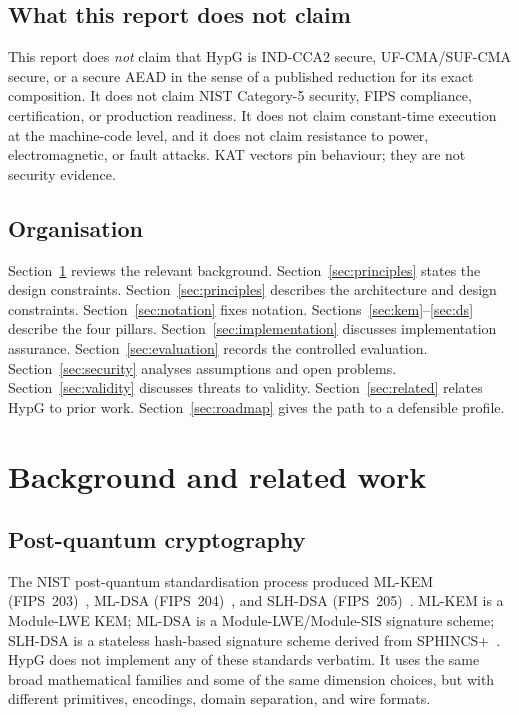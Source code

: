 \documentclass[runningheads]{llncs}
\begin{document}
\subsection{What this report does not claim}

This report does \emph{not} claim that HypG is IND-CCA2 secure,
UF-CMA/SUF-CMA secure, or a secure AEAD in the sense of a published
reduction for its exact composition.  It does not claim NIST Category-5
security, FIPS compliance, certification, or production readiness.  It
does not claim constant-time execution at the machine-code level, and it
does not claim resistance to power, electromagnetic, or fault attacks.
KAT vectors pin behaviour; they are not security evidence.

\subsection{Organisation}

Section~\ref{sec:background} reviews the relevant background.
Section~\ref{sec:principles} states the design constraints.
Section~\ref{sec:principles} describes the architecture and design constraints.
Section~\ref{sec:notation} fixes notation.
Sections~\ref{sec:kem}--\ref{sec:ds} describe the four pillars.
Section~\ref{sec:implementation} discusses implementation assurance.
Section~\ref{sec:evaluation} records the controlled evaluation.
Section~\ref{sec:security} analyses assumptions and open problems.
Section~\ref{sec:validity} discusses threats to validity.
Section~\ref{sec:related} relates HypG to prior work.
Section~\ref{sec:roadmap} gives the path to a defensible profile.

\section{Background and related work}
\label{sec:background}

\subsection{Post-quantum cryptography}

The NIST post-quantum standardisation process produced ML-KEM
(FIPS~203)~\cite{fips203}, ML-DSA (FIPS~204)~\cite{fips204}, and
SLH-DSA (FIPS~205)~\cite{fips205}.  ML-KEM is a Module-LWE KEM;
ML-DSA is a Module-LWE/Module-SIS signature scheme; SLH-DSA is a
stateless hash-based signature scheme derived from
SPHINCS+~\cite{sphincs}.  HypG does not implement any of these
standards verbatim.  It uses the same broad mathematical families and
some of the same dimension choices, but with different primitives,
encodings, domain separation, and wire formats.
\end{document}
